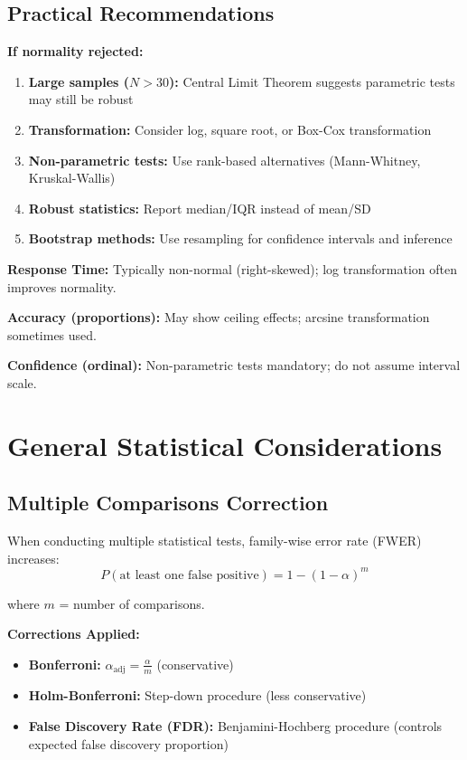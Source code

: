 \documentclass[12pt,a4paper]{article}
\begin{document}
\subsection{Practical Recommendations}

\textbf{If normality rejected:}
\begin{enumerate}
    \item \textbf{Large samples ($N > 30$):} Central Limit Theorem suggests parametric tests may still be robust
    \item \textbf{Transformation:} Consider log, square root, or Box-Cox transformation
    \item \textbf{Non-parametric tests:} Use rank-based alternatives (Mann-Whitney, Kruskal-Wallis)
    \item \textbf{Robust statistics:} Report median/IQR instead of mean/SD
    \item \textbf{Bootstrap methods:} Use resampling for confidence intervals and inference
\end{enumerate}

\textbf{Response Time:} Typically non-normal (right-skewed); log transformation often improves normality.

\textbf{Accuracy (proportions):} May show ceiling effects; arcsine transformation sometimes used.

\textbf{Confidence (ordinal):} Non-parametric tests mandatory; do not assume interval scale.

\newpage
\section{General Statistical Considerations}

\subsection{Multiple Comparisons Correction}

When conducting multiple statistical tests, family-wise error rate (FWER) increases:
\begin{equation}
P(\text{at least one false positive}) = 1 - (1 - \alpha)^m
\end{equation}

where $m$ = number of comparisons.

\textbf{Corrections Applied:}
\begin{itemize}
    \item \textbf{Bonferroni:} $\alpha_{\text{adj}} = \frac{\alpha}{m}$ (conservative)
    \item \textbf{Holm-Bonferroni:} Step-down procedure (less conservative)
    \item \textbf{False Discovery Rate (FDR):} Benjamini-Hochberg procedure (controls expected false discovery proportion)
\end{itemize}
\end{document}
